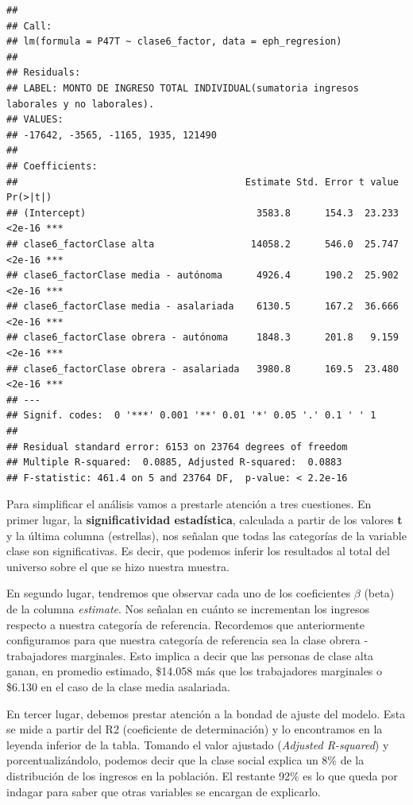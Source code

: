 \documentclass[
]{book}
\begin{document}
\begin{verbatim}
## 
## Call:
## lm(formula = P47T ~ clase6_factor, data = eph_regresion)
## 
## Residuals:
## LABEL: MONTO DE INGRESO TOTAL INDIVIDUAL(sumatoria ingresos laborales y no laborales). 
## VALUES:
## -17642, -3565, -1165, 1935, 121490
## 
## Coefficients:
##                                        Estimate Std. Error t value Pr(>|t|)    
## (Intercept)                              3583.8      154.3  23.233   <2e-16 ***
## clase6_factorClase alta                 14058.2      546.0  25.747   <2e-16 ***
## clase6_factorClase media - autónoma      4926.4      190.2  25.902   <2e-16 ***
## clase6_factorClase media - asalariada    6130.5      167.2  36.666   <2e-16 ***
## clase6_factorClase obrera - autónoma     1848.3      201.8   9.159   <2e-16 ***
## clase6_factorClase obrera - asalariada   3980.8      169.5  23.480   <2e-16 ***
## ---
## Signif. codes:  0 '***' 0.001 '**' 0.01 '*' 0.05 '.' 0.1 ' ' 1
## 
## Residual standard error: 6153 on 23764 degrees of freedom
## Multiple R-squared:  0.0885, Adjusted R-squared:  0.0883 
## F-statistic: 461.4 on 5 and 23764 DF,  p-value: < 2.2e-16
\end{verbatim}

Para simplificar el análisis vamos a prestarle atención a tres cuestiones. En primer lugar, la \textbf{significatividad estadística}, calculada a partir de los valores \textbf{t} y la última columna (estrellas), nos señalan que todas las categorías de la variable clase son significativas. Es decir, que podemos inferir los resultados al total del universo sobre el que se hizo nuestra muestra.

En segundo lugar, tendremos que observar cada uno de los coeficientes \(\beta\) (beta) de la columna \emph{estimate}. Nos señalan en cuánto se incrementan los ingresos respecto a nuestra categoría de referencia. Recordemos que anteriormente configuramos para que nuestra categoría de referencia sea la clase obrera - trabajadores marginales. Esto implica a decir que las personas de clase alta ganan, en promedio estimado, \$14.058 más que los trabajadores marginales o \$6.130 en el caso de la clase media asalariada.

En tercer lugar, debemos prestar atención a la bondad de ajuste del modelo. Esta se mide a partir del R2 (coeficiente de determinación) y lo encontramos en la leyenda inferior de la tabla. Tomando el valor ajustado (\emph{Adjusted R-squared}) y porcentualizándolo, podemos decir que la clase social explica un 8\% de la distribución de los ingresos en la población. El restante 92\% es lo que queda por indagar para saber que otras variables se encargan de explicarlo.
\end{document}
